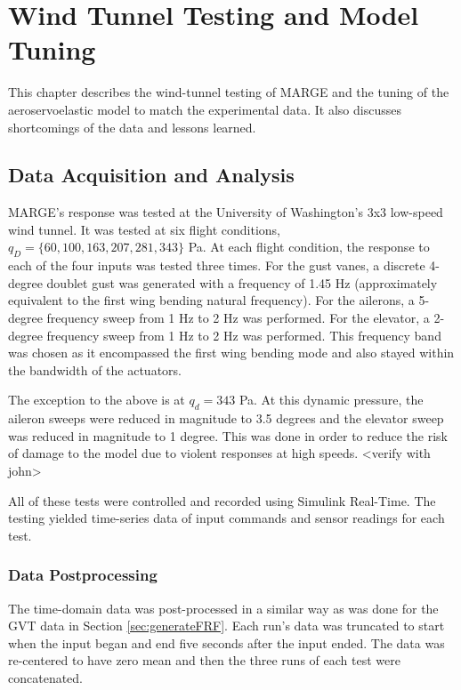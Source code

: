 \chapter{Wind Tunnel Testing and Model Tuning}
\label{ch:windTunnel}

This chapter describes the wind-tunnel testing of MARGE and the tuning of the aeroservoelastic model to match the experimental data. It also discusses shortcomings of the data and lessons learned.

\section{Data Acquisition and Analysis} %

MARGE's response was tested at the University of Washington's 3x3 low-speed wind tunnel. It was tested at six flight conditions, $q_D=\{60,100,163,207,281,343\}$ Pa. At each flight condition, the response to each of the four inputs was tested three times. For the gust vanes, a discrete 4-degree doublet gust was generated with a frequency of 1.45 Hz (approximately equivalent to the first wing bending natural frequency). For the ailerons, a 5-degree frequency sweep from 1 Hz to 2 Hz was performed. For the elevator, a 2-degree frequency sweep from 1 Hz to 2 Hz was performed. This frequency band was chosen as it encompassed the first wing bending mode and also stayed within the bandwidth of the actuators.

The exception to the above is at $q_d=343$ Pa. At this dynamic pressure, the aileron sweeps were reduced in magnitude to 3.5 degrees and the elevator sweep was reduced in magnitude to 1 degree. This was done in order to reduce the risk of damage to the model due to violent responses at high speeds. <verify with john>

All of these tests were controlled and recorded using Simulink Real-Time. The testing yielded time-series data of input commands and sensor readings for each test.

\subsection{Data Postprocessing}
The time-domain data was post-processed in a similar way as was done for the GVT data in Section \ref{sec:generateFRF}. Each run's data was truncated to start when the input began and end five seconds after the input ended. The data was re-centered to have zero mean and then the three runs of each test were concatenated.

